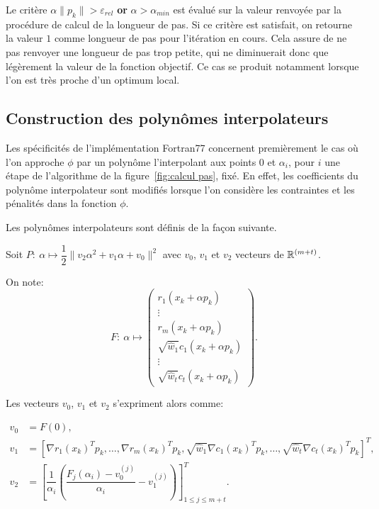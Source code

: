 Le critère $\alpha \|p_{k}\| > \varepsilon_{rel}$ \textbf{or} $\alpha > \alpha_{min}$ est évalué sur la valeur renvoyée par la procédure de calcul de la longueur de pas. 
Si ce critère est satisfait, on retourne la valeur $1$ comme longueur de pas pour l'itération en cours. 
Cela assure de ne pas renvoyer une longueur de pas trop petite, qui ne diminuerait donc que légèrement la valeur de la fonction objectif. Ce cas se produit 
notamment lorsque l'on est très proche d'un optimum local.

\subsection*{Construction des polynômes interpolateurs}

Les spécificités de l'implémentation Fortran77 concernent premièrement le cas où l'on approche $\phi$ par un polynôme l'interpolant aux points $0$ et $\alpha_i$, 
pour $i$ une étape de l'algorithme de la figure~\ref{fig:calcul pas}, fixé. 
En effet, les coefficients du polynôme interpolateur sont modifiés lorsque l'on considère les contraintes et les pénalités dans la fonction $\phi$.

Les polynômes interpolateurs sont définis de la façon suivante.

Soit $P:\ \alpha \mapsto \dfrac{1}{2}\|v_2\alpha^2 + v_1\alpha + v_0\|^2$ avec $v_0$, $v_1$ et $v_2$ vecteurs de $\mathbb{R}^{(m+t)}$.

On note:
\[
F:\ \alpha \mapsto  \begin{pmatrix}
r_1(x_{k}+\alpha p_{k}) \\
\vdots \\
r_m(x_{k}+\alpha p_{k}) \\
\sqrt{\hat{w}_1}c_1(x_{k}+\alpha p_{k}) \\
\vdots \\
\sqrt{\hat{w}_t}c_t(x_{k}+\alpha p_{k})
\end{pmatrix}.
\]

Les vecteurs $v_0$, $v_1$ et $v_2$ s'expriment alors comme:

\begin{equation} 
\begin{aligned}
    v_0 &= F(0), \\
    v_1 &= \left[\nabla r_1(x_{k})^Tp_{k},\ldots, \nabla r_m(x_{k})^Tp_{k}, \sqrt{\hat{w}_1}\nabla c_1(x_{k})^Tp_{k}, \ldots, \sqrt{\hat{w}_t}\nabla c_t(x_{k})^Tp_{k} \right]^T,\\
    v_2 &= \left[ \dfrac{1}{\alpha_i}\left( \dfrac{F_j(\alpha_i) - v_0^{(j)}}{\alpha_i} - v_1^{(j)}\right)\right]_{1 \leq j \leq m+t}^T.
\end{aligned}
\end{equation}

